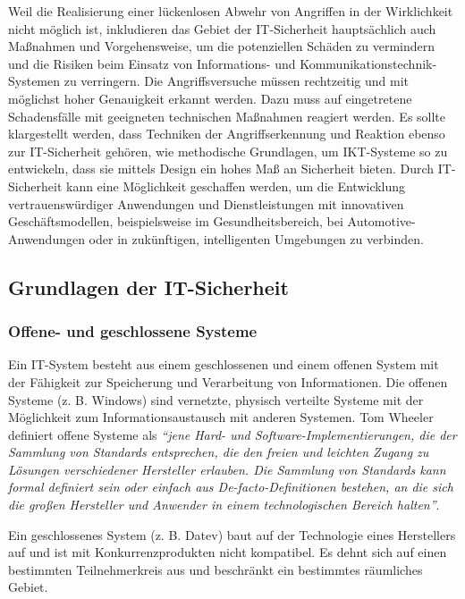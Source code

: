 Weil die Realisierung einer lückenlosen Abwehr von Angriffen in der Wirklichkeit nicht möglich ist, inkludieren das Gebiet der IT-Sicherheit hauptsächlich auch Maßnahmen und Vorgehensweise, um die potenziellen Schäden zu vermindern und die Risiken beim Einsatz von Informations- und Kommunikationstechnik-Systemen zu verringern. Die Angriffsversuche müssen rechtzeitig und mit möglichst hoher Genauigkeit erkannt werden. Dazu muss auf eingetretene Schadensfälle mit geeigneten technischen Maßnahmen reagiert werden. Es sollte klargestellt werden, dass Techniken der Angriffserkennung und Reaktion ebenso zur IT-Sicherheit gehören, wie methodische Grundlagen, um IKT-Systeme so zu entwickeln, dass sie mittels Design ein hohes Maß an Sicherheit bieten. Durch IT-Sicherheit kann eine Möglichkeit geschaffen werden, um die Entwicklung vertrauenswürdiger Anwendungen und Dienstleistungen mit innovativen Geschäftsmodellen, beispielsweise im Gesundheitsbereich, bei Automotive-Anwendungen oder in zukünftigen, intelligenten Umgebungen zu verbinden\cite[20--21]{eckert2013sicherheit}.

\subsection{Grundlagen der IT-Sicherheit}

\subsubsection{Offene- und geschlossene Systeme}

Ein IT-System besteht aus einem geschlossenen und einem offenen System mit der Fähigkeit zur Speicherung und Verarbeitung von Informationen. Die offenen Systeme (z. B. Windows) sind vernetzte, physisch verteilte Systeme mit der Möglichkeit zum Informationsaustausch mit anderen Systemen\cite[22--23]{eckert2013sicherheit}. Tom Wheeler definiert offene Systeme als \emph{"`jene Hard- und Software-Implementierungen, die der Sammlung von Standards entsprechen, die den freien und leichten Zugang zu Lösungen verschiedener Hersteller erlauben. Die Sammlung von Standards kann formal definiert sein oder einfach aus De-facto-Definitionen bestehen, an die sich die großen Hersteller und Anwender in einem technologischen Bereich halten"'}\cite[4]{wheeler2013offene}. 

Ein geschlossenes System (z. B. Datev) baut auf der Technologie eines Herstellers auf und ist mit Konkurrenzprodukten nicht kompatibel.  Es dehnt sich auf einen bestimmten Teilnehmerkreis aus und beschränkt ein bestimmtes räumliches Gebiet\cite[22--23]{eckert2013sicherheit}.

